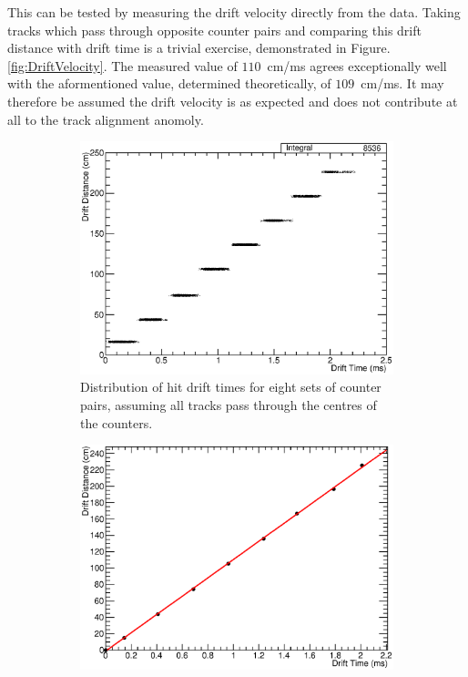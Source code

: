 This can be tested by measuring the drift velocity directly from the data.  Taking tracks which pass through opposite counter pairs and comparing this drift distance with drift time is a trivial exercise, demonstrated in Figure. \ref{fig:DriftVelocity}.  The measured value of $110$~cm/ms agrees exceptionally well with the aformentioned value, determined theoretically, of $109$~cm/ms.  It may therefore be assumed the drift velocity is as expected and does not contribute at all to the track alignment anomoly.

\begin{figure}
  \centering
  \begin{subfigure}[t]{0.48\linewidth}
    \centering
    \includegraphics[width=\textwidth]{DistanceDriftTime.eps}
    \caption{Distribution of hit drift times for eight sets of counter pairs, assuming all tracks pass through the centres of the counters.}
    \label{fig:DistanceDriftTime}
  \end{subfigure}
  \hfill
  \begin{subfigure}[t]{0.48\linewidth}
    \centering
    \includegraphics[width=\textwidth]{DriftVelocity.eps}

\end{subfigure}
\end{figure}

